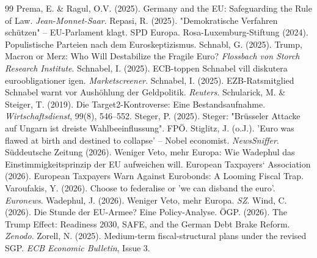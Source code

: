 \documentclass[12pt,a4paper]{article}
\begin{document}
\begin{thebibliography}{99}
		 Prema, E. \& Ragul, O.V. (2025). Germany and the EU: Safeguarding the Rule of Law. \textit{Jean-Monnet-Saar}.
		 Repasi, R. (2025). "Demokratische Verfahren schützen" – EU-Parlament klagt. SPD Europa.
		 Rosa-Luxemburg-Stiftung (2024). Populistische Parteien nach dem Euroskeptizismus.
		 Schnabl, G. (2025). Trump, Macron or Merz: Who Will Destabilize the Fragile Euro? \textit{Flossbach von Storch Research Institute}.
		 Schnabel, I. (2025). ECB-toppen Schnabel vill diskutera euroobligationer igen. \textit{Marketscreener}.
		 Schnabel, I. (2025). EZB-Ratsmitglied Schnabel warnt vor Aushöhlung der Geldpolitik. \textit{Reuters}.
		 Schularick, M. \& Steiger, T. (2019). Die Target2-Kontroverse: Eine Bestandsaufnahme. \textit{Wirtschaftsdienst}, 99(8), 546–552.
		 Steger, P. (2025). Steger: "Brüsseler Attacke auf Ungarn ist dreiste Wahlbeeinflussung". FPÖ.
		 Stiglitz, J. (o.J.). 'Euro was flawed at birth and destined to collapse' – Nobel economist. \textit{NewsSniffer}.
		 Süddeutsche Zeitung (2026). Weniger Veto, mehr Europa: Wie Wadephul das Einstimmigkeitsprinzip der EU aufweichen will.
		 European Taxpayers‘ Association (2026). European Taxpayers Warn Against Eurobonds: A Looming Fiscal Trap.
		 Varoufakis, Y. (2026). Choose to federalise or 'we can disband the euro'. \textit{Euronews}.
		 Wadephul, J. (2026). Weniger Veto, mehr Europa. \textit{SZ}.
		 Wind, C. (2026). Die Stunde der EU-Armee? Eine Policy-Analyse. ÖGP.
		 (2026). The Trump Effect: Readiness 2030, SAFE, and the German Debt Brake Reform. \textit{Zenodo}.
		 Zorell, N. (2025). Medium-term fiscal-structural plans under the revised SGP. \textit{ECB Economic Bulletin}, Issue 3.
	\end{thebibliography}
	
\end{document}
